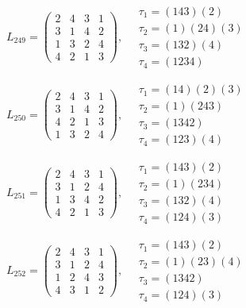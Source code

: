 $L_{249} = \begin{pmatrix} 2 & 4 & 3 & 1 \\ 3 & 1 & 4 & 2 \\ 1 & 3 & 2 & 4 \\ 4 & 2 & 1 & 3 \end{pmatrix}, \quad \begin{matrix} \tau_{1} = (1 4 3)(2) \\ \tau_{2} = (1)(2 4)(3) \\ \tau_{3} = (1 3 2)(4) \\ \tau_{4} = (1 2 3 4) \end{matrix}$

$L_{250} = \begin{pmatrix} 2 & 4 & 3 & 1 \\ 3 & 1 & 4 & 2 \\ 4 & 2 & 1 & 3 \\ 1 & 3 & 2 & 4 \end{pmatrix}, \quad \begin{matrix} \tau_{1} = (1 4)(2)(3) \\ \tau_{2} = (1)(2 4 3) \\ \tau_{3} = (1 3 4 2) \\ \tau_{4} = (1 2 3)(4) \end{matrix}$

$L_{251} = \begin{pmatrix} 2 & 4 & 3 & 1 \\ 3 & 1 & 2 & 4 \\ 1 & 3 & 4 & 2 \\ 4 & 2 & 1 & 3 \end{pmatrix}, \quad \begin{matrix} \tau_{1} = (1 4 3)(2) \\ \tau_{2} = (1)(2 3 4) \\ \tau_{3} = (1 3 2)(4) \\ \tau_{4} = (1 2 4)(3) \end{matrix}$

$L_{252} = \begin{pmatrix} 2 & 4 & 3 & 1 \\ 3 & 1 & 2 & 4 \\ 1 & 2 & 4 & 3 \\ 4 & 3 & 1 & 2 \end{pmatrix}, \quad \begin{matrix} \tau_{1} = (1 4 3)(2) \\ \tau_{2} = (1)(2 3)(4) \\ \tau_{3} = (1 3 4 2) \\ \tau_{4} = (1 2 4)(3) \end{matrix}$

